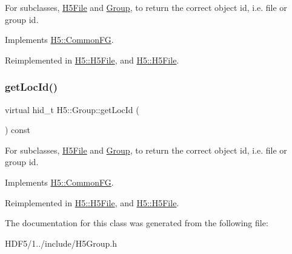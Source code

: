 For subclasses, \hyperlink{class_h5_1_1_h5_file}{H5\+File} and \hyperlink{class_h5_1_1_group}{Group}, to return the correct object id, i.\+e. file or group id. 

Implements \hyperlink{class_h5_1_1_common_f_g_a28dd053d0fa4ebad7fca2949e65d1987}{H5\+::\+Common\+FG}.



Reimplemented in \hyperlink{class_h5_1_1_h5_file_ab1c5775703262ac913dd164e77d60abc}{H5\+::\+H5\+File}, and \hyperlink{class_h5_1_1_h5_file_ab1c5775703262ac913dd164e77d60abc}{H5\+::\+H5\+File}.

\mbox{\label{class_h5_1_1_group_ae8fa39e9d934d254cd1bc2302a7e6391}} 
\subsubsection{\texorpdfstring{get\+Loc\+Id()}{getLocId()}\hspace{0.1cm}{\footnotesize\ttfamily [2/2]}}
{\footnotesize\ttfamily virtual hid\+\_\+t H5\+::\+Group\+::get\+Loc\+Id (\begin{DoxyParamCaption}{ }\end{DoxyParamCaption}) const\hspace{0.3cm}{\ttfamily [virtual]}}

For subclasses, \hyperlink{class_h5_1_1_h5_file}{H5\+File} and \hyperlink{class_h5_1_1_group}{Group}, to return the correct object id, i.\+e. file or group id. 

Implements \hyperlink{class_h5_1_1_common_f_g_a28dd053d0fa4ebad7fca2949e65d1987}{H5\+::\+Common\+FG}.



Reimplemented in \hyperlink{class_h5_1_1_h5_file_ab1c5775703262ac913dd164e77d60abc}{H5\+::\+H5\+File}, and \hyperlink{class_h5_1_1_h5_file_ab1c5775703262ac913dd164e77d60abc}{H5\+::\+H5\+File}.



The documentation for this class was generated from the following file\+:\begin{DoxyCompactItemize}
\item 
H\+D\+F5/1../include/\+H5\+Group.\+h\end{DoxyCompactItemize}
